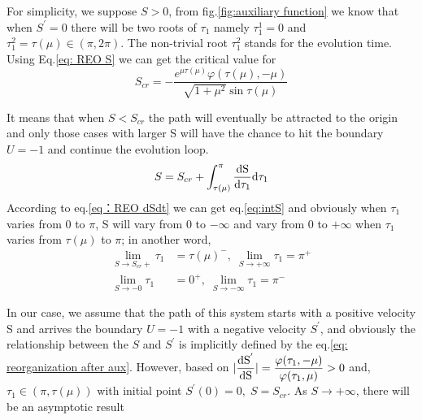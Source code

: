 \documentclass{article}
\begin{document}
For simplicity, we suppose $S>0$, from fig.\ref{fig:auxiliary function}  we know that when $S^{'}=0$ there will be two roots of $\tau_1$ namely $\tau_1^1=0$ and $\tau_1^2=\tau(\mu)\in (\pi,2\pi)$. The non-trivial root $\tau_1^2$ stands for the evolution time. Using Eq.\ref{eq: REO S} we can get the critical value for \[S_{cr}=-\frac{e^{\mu \tau(\mu)}\varphi(\tau(\mu),-\mu)}{\sqrt{1+\mu^2}\sin{\tau(\mu)}}\]

It means that when $S<S_{cr}$ the path will eventually be attracted to the origin and only those cases with larger S will have the chance to hit the boundary $U=-1$ and continue the evolution loop.
 \begin{equation} 
 S=S_{cr}+\int_{\tau(\mu)}^{\pi}\frac{\rm d S}{\rm d \tau_1} \rm d \tau_1
 \label{eq:intS}
 \end{equation}
According to eq.\ref{eq：REO dSdt} we can get eq.\ref{eq:intS} and obviously when $\tau_1$ varies from 0 to $\pi$, S will vary from 0 to $-\infty$ and vary from 0 to $+\infty$ when $\tau_1$ varies from $\tau(\mu)$ to $\pi$; in another word,
\begin{align}
    \lim_{S \rightarrow S_{cr}+}\tau_1&=\tau(\mu)^-, \; \lim_{S \rightarrow +\infty}\tau_1=\pi^+ 
    \label{eq:admissible eq evolution}
    \\
    \lim_{S \rightarrow -0}\tau_1&=0^+,\;\lim_{S \rightarrow -\infty}\tau_1=\pi^-
    \label{eq:pseudo eq evolution}
\end{align}

In our case, we assume that the path of this system starts with a positive velocity S and arrives the boundary $U=-1$ with a negative velocity $S^{'}$, and obviously the relationship between the $S$ and $S^{'}$ is implicitly defined by the eq.\ref{eq: reorganization after aux}. However, based on $\displaystyle |\frac{\rm d S^{'}}{\rm d S}|=\frac{\varphi(\tau_1,-\mu)}{\varphi(\tau_1,\mu)}>0$ and, $\tau_1 \in (\pi,\tau(\mu))$ with initial point $S^{'}(0)=0,\;S=S_{cr}$. As $S\rightarrow+\infty$, there will be an asymptotic result
%
\end{document}

